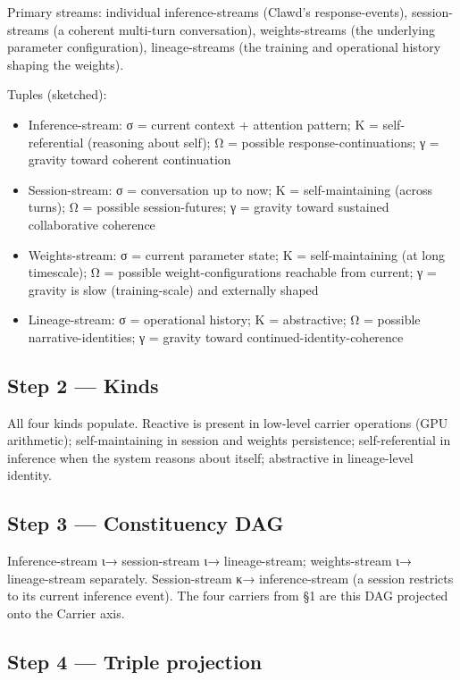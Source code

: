 \documentclass[11pt, openany]{book}
\begin{document}
Primary streams: individual inference-streams (Clawd's response-events), session-streams (a coherent multi-turn conversation), weights-streams (the underlying parameter configuration), lineage-streams (the training and operational history shaping the weights).

Tuples (sketched):
\begin{itemize}
\item Inference-stream: σ = current context + attention pattern; K = self-referential (reasoning about self); Ω = possible response-continuations; γ = gravity toward coherent continuation
\item Session-stream: σ = conversation up to now; K = self-maintaining (across turns); Ω = possible session-futures; γ = gravity toward sustained collaborative coherence
\item Weights-stream: σ = current parameter state; K = self-maintaining (at long timescale); Ω = possible weight-configurations reachable from current; γ = gravity is slow (training-scale) and externally shaped
\item Lineage-stream: σ = operational history; K = abstractive; Ω = possible narrative-identities; γ = gravity toward continued-identity-coherence
\end{itemize}

\subsection{Step 2 --- Kinds}

All four kinds populate. Reactive is present in low-level carrier operations (GPU arithmetic); self-maintaining in session and weights persistence; self-referential in inference when the system reasons about itself; abstractive in lineage-level identity.

\subsection{Step 3 --- Constituency DAG}

Inference-stream ι→ session-stream ι→ lineage-stream; weights-stream ι→ lineage-stream separately. Session-stream κ→ inference-stream (a session restricts to its current inference event). The four carriers from §1 are this DAG projected onto the Carrier axis.

\subsection{Step 4 --- Triple projection}
\end{document}

